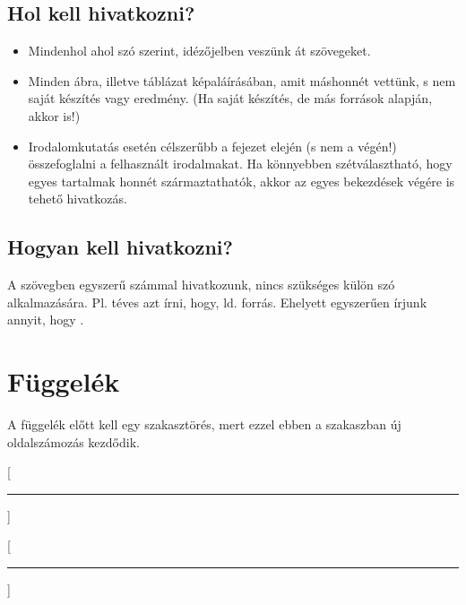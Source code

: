 \documentclass[a4paper, 12pt]{article}
\begin{document}
	\subsection{Hol kell hivatkozni?}
	\begin{itemize}[label=\color{bme}$\bullet$]
		\item Mindenhol ahol szó szerint, idézőjelben veszünk át szövegeket.
		\item Minden ábra, illetve táblázat képaláírásában, amit máshonnét vettünk, s nem saját készítés vagy eredmény.
		(Ha saját készítés, de más források alapján, akkor is!)
		\item Irodalomkutatás esetén célszerűbb a fejezet elején (s nem a végén!) összefoglalni a felhasznált irodalmakat.
		Ha könnyebben szétválasztható, hogy egyes tartalmak honnét származtathatók, akkor az egyes bekezdések végére is tehető hivatkozás.
	\end{itemize}

	\subsection{Hogyan kell hivatkozni?}
	A szövegben egyszerű számmal hivatkozunk, nincs szükséges külön szó alkalmazására.
	Pl. téves azt írni, hogy, ld. \cite{BOOK:2} forrás. Ehelyett egyszerűen írjunk annyit, hogy \cite{BOOK:2}.
	\newpage
	 
	
	\newpage




	\setcounter{page}{1}
	\setcounter{section}{0}
	\section*{Függelék}
	A függelék előtt kell egy szakasztörés, mert ezzel ebben a szakaszban új oldalszámozás kezdődik.

	[\vspace{-3ex}\rule{\textwidth}{0.5pt}]

	[\vspace{-3ex}\rule{\textwidth}{0.5pt}]
\end{document}
